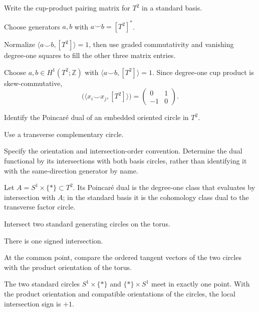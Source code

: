 \begin{exercise}\label{exr:viii33-03}
Write the cup-product pairing matrix for $T^2$ in a standard basis.
\end{exercise}
\begin{hint}
Choose generators $a,b$ with $a\smile b=[T^2]^*$.

Normalize \(\langle a\smile b,[T^2]\rangle=1\), then use graded commutativity and vanishing degree-one squares to fill the other three matrix entries.
\end{hint}
\begin{solution}
Choose \(a,b\in H^1(T^2;\mathbb Z)\) with \(\langle a\smile b,[T^2]\rangle=1\). Since degree-one cup product is skew-commutative,
\[
\bigl(\langle x_i\smile x_j,[T^2]\rangle\bigr)
=
\begin{pmatrix}0&1\\-1&0\end{pmatrix}.
\]
\end{solution}

\begin{exercise}\label{exr:viii33-04}
Identify the Poincaré dual of an embedded oriented circle in $T^2$.
\end{exercise}
\begin{hint}
Use a transverse complementary circle.

Specify the orientation and intersection-order convention. Determine the dual functional by its intersections with both basis circles, rather than identifying it with the same-direction generator by name.
\end{hint}
\begin{solution}
Let \(A=S^1\times\{\ast\}\subset T^2\). Its Poincaré dual is the degree-one class that evaluates by intersection with \(A\); in the standard basis it is the cohomology class dual to the transverse factor circle.
\end{solution}

\begin{exercise}\label{exr:viii33-05}
Intersect two standard generating circles on the torus.
\end{exercise}
\begin{hint}
There is one signed intersection.

At the common point, compare the ordered tangent vectors of the two circles with the product orientation of the torus.
\end{hint}
\begin{solution}
The two standard circles \(S^1\times\{\ast\}\) and \(\{\ast\}\times S^1\) meet in exactly one point. With the product orientation and compatible orientations of the circles, the local intersection sign is \(+1\).
\end{solution}

